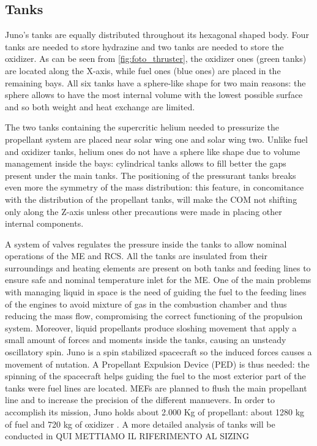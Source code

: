 
\subsection{Tanks} 
\label{sec: tanks}
Juno's tanks are equally distributed throughout its hexagonal shaped body. Four tanks are needed to store hydrazine and two tanks are needed to store the oxidizer. As can be seen from \autoref{fig:foto_thruster}, the oxidizer ones (green tanks) are located along the X-axis, while fuel ones (blue ones) are placed in the remaining bays. All six tanks have a sphere-like shape for two main reasons: the sphere allows to have the most internal volume with the lowest possible surface and so both weight and heat exchange are limited.

The two tanks\cite{2tankshe} containing the supercritic helium needed to pressurize the propellant system are placed near solar wing one and solar wing two. Unlike fuel and oxidizer tanks, helium ones do not have a sphere like shape due to volume management inside the bays\cite{he_tank}: cylindrical tanks allows to fill better the gaps present under the main tanks. The positioning of the pressurant tanks breaks even more the symmetry of the mass distribution: this feature, in concomitance with the distribution of the propellant tanks, will make the COM not shifting only along the Z-axis unless other precautions were made in placing other internal components. 

A system of valves regulates the pressure inside the tanks to allow nominal operations of the ME and RCS. All the tanks are insulated from their surroundings and heating elements are present on both tanks and feeding lines to ensure safe and nominal temperature inlet for the ME\cite{Leros}.
One of the main problems with managing liquid in space is the need of guiding the fuel to the feeding lines of the engines to avoid mixture of gas in the combustion chamber and thus reducing the mass flow, compromising the correct functioning of the propulsion system. Moreover, liquid propellants produce sloshing movement that apply a small amount of forces and moments inside the tanks, causing an unsteady oscillatory spin. Juno is a spin stabilized spacecraft so the induced forces causes a movement of nutation. A Propellant Expulsion Device (PED) is thus needed: the spinning of the spacecraft helps guiding the fuel to the most exterior part of the tanks were fuel lines are located\cite{slosh}. 
MEFs are planned to flush the main propellant line and to increase the precision of the different manuevers. 
In order to accomplish its mission, Juno holds about 2.000 Kg of propellant: about 1280 kg of fuel and 720 kg of oxidizer \cite{junno_inner}. A more detailed analysis of tanks will be conducted in QUI METTIAMO IL RIFERIMENTO AL SIZING
 











